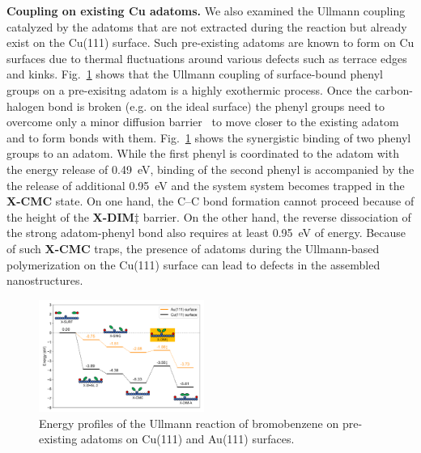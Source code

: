 \documentclass[aps,prb,amsmath,amssymb,11pt]{revtex4-1}
\begin{document}
\textbf{Coupling on existing Cu adatoms.} We also examined the Ullmann coupling catalyzed by the adatoms that are not extracted during the reaction but already exist on the Cu(111) surface. Such pre-existing adatoms are known to form on Cu surfaces due to thermal fluctuations around various defects such as terrace edges and kinks. 
Fig.~\ref{fig:adatomullmann} shows that the Ullmann coupling of surface-bound phenyl groups on a pre-exisitng adatom is a highly exothermic process. Once the carbon-halogen bond is broken (e.g. on the ideal surface) the phenyl groups need to overcome only a minor diffusion barrier~\cite{pccp2010} to move closer to the existing adatom and to form bonds with them. 
Fig.~\ref{fig:adatomullmann} shows the synergistic binding of two phenyl groups to an adatom. While the first phenyl is coordinated to the adatom with the energy release of \SI{0.49}{\electronvolt}, binding of the second phenyl is accompanied by the the release of additional \SI{0.95}{\electronvolt} and the system system becomes trapped in the \textbf{X-CMC} state. On one hand, the C--C bond formation cannot proceed because of the height of the \textbf{X-DIM$\ddagger$} barrier. On the other hand, the reverse dissociation of the strong adatom-phenyl bond also requires at least \SI{0.95}{\electronvolt} of energy. 
Because of such \textbf{X-CMC} traps, the presence of adatoms during the Ullmann-based polymerization on the Cu(111) surface can lead to defects in the assembled nanostructures.

\begin{figure}[bt]
\centering
\includegraphics[width=0.48\textwidth]{Fig/ullmann_adatom.pdf}
\caption{Energy profiles of the Ullmann reaction of bromobenzene on pre-existing adatoms on Cu(111) and Au(111) surfaces.}
\label{fig:adatomullmann}
\end{figure}
\end{document}
